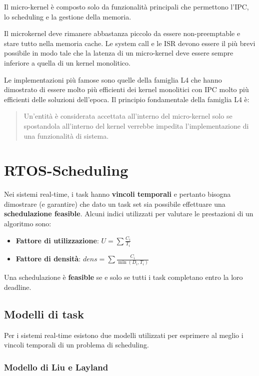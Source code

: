 \documentclass[11pt,a4paper]{report}
\begin{document}
Il micro-kernel è composto solo da funzionalità principali che permettono l'IPC, lo scheduling e la gestione della memoria.

Il microkernel deve rimanere abbastanza piccolo da essere non-preemptable e stare tutto nella memoria cache. Le system call e le ISR devono essere il più brevi possibile in modo tale che la latenza di un micro-kernel deve essere sempre inferiore a quella di un kernel monolitico.

Le implementazioni più famose sono quelle della famiglia L4 che hanno dimostrato di essere molto più efficienti dei kernel monolitici con IPC molto più efficienti delle soluzioni dell'epoca. Il principio fondamentale della famiglia L4 è:
\begin{quote}
    Un'entità è considerata accettata all'interno del micro-kernel solo se spostandola all'interno del kernel verrebbe impedita l'implementazione di una funzionalità di sistema.
\end{quote}

\chapter{RTOS-Scheduling}

Nei sistemi real-time, i task hanno \textbf{vincoli temporali} e pertanto bisogna dimostrare (e garantire) che dato un task set sia possibile effettuare una \textbf{schedulazione feasible}. Alcuni indici utilizzati per valutare le prestazioni di un algoritmo sono:

\begin{itemize}
    \item \textbf{Fattore di utilizzazione}: $U = \sum \frac{C_i}{T_i}$
    \item \textbf{Fattore di densità}: $dens = \sum \frac{C_i}{\min(D_i, T_i)}$
\end{itemize}

Una schedulazione è \textbf{feasible} se e solo se tutti i task completano entro la loro deadline.

\section{Modelli di task}

Per i sistemi real-time esistono due modelli utilizzati per esprimere al meglio i vincoli temporali di un problema di scheduling.

\subsection{Modello di Liu e Layland}
\end{document}
